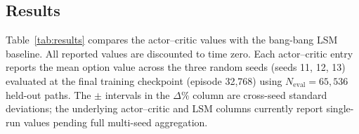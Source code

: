\documentclass[a4paper,fleqn]{cas-dc}
\begin{document}
\subsection{Results}

Table~\ref{tab:results} compares the actor--critic values with the bang-bang LSM baseline.
All reported values are discounted to time zero.
Each actor--critic entry reports the mean option value across the three random seeds
(seeds 11, 12, 13) evaluated at the final training checkpoint (episode 32{,}768) using
$N_{\mathrm{eval}} = 65{,}536$ held-out paths.
The $\pm$ intervals in the $\Delta\%$ column are cross-seed standard deviations; the underlying actor--critic and LSM columns currently report single-run values pending full multi-seed aggregation.
\end{document}
